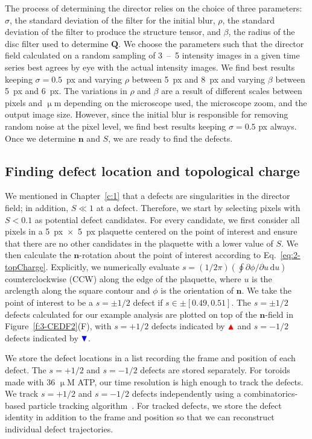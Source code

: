 The process of determining the director relies on the choice of three parameters: $\sigma$, the standard deviation of the filter for the initial blur, $\rho$, the standard deviation of the filter to produce the structure tensor, and $\beta$, the radius of the disc filter used to determine $\mathbf{Q}$.
We choose the parameters such that the director field calculated on a random sampling of 3~--~5 intensity images in a given time series best agrees by eye with the actual intensity images.
We find best results keeping $\sigma = 0.5$~px and varying $\rho$ between 5~px and 8~px and varying $\beta$ between 5~px and 6~px.
The variations in $\rho$ and $\beta$ are a result of different scales between pixels and $\upmu$m depending on the microscope used, the microscope zoom, and the output image size.
However, since the initial blur is responsible for removing random noise at the pixel level, we find best results keeping $\sigma = 0.5$ px always.
Once we determine $\mathbf{n}$ and $S$, we are ready to find the defects.


\subsection{Finding defect location and topological charge}
We mentioned in Chapter~\ref{c:1} that a defects are singularities in the director field; in addition, $S \ll 1$ at a defect.
Therefore, we start by selecting pixels with $S < 0.1$ as potential defect candidates.
For every candidate, we first consider all pixels in a 5~px~$\times$~5~px plaquette centered on the point of interest and ensure that there are no other candidates in the plaquette with a lower value of $S$.
We then calculate the $\mathbf{n}$-rotation about the point of interest according to Eq.~\ref{eq:2-topCharge}.
Explicitly, we numerically evaluate $s = (1 / 2 \pi)(\oint \partial\phi / \partial u \, \textrm{d}u)$ counterclockwise (CCW) along the edge of the plaquette, where $u$ is the arclength along the square contour and $\phi$ is the orientation of $\mathbf{n}$.
We take the point of interest to be a $s = \pm 1/2$ defect if $s \in \pm [0.49,0.51]$.
The $s=\pm1/2$ defects calculated for our example analysis are plotted on top of the $\mathbf{n}$-field in Figure~\ref{f:3-CEDF2}(F), with $s = +1/2$ defects indicated by ${\color{red} \blacktriangle } $  and $s = -1/2$ defects indicated by ${ \color{blue} \blacktriangledown } $.

We store the defect locations in a list recording the frame and position of each defect.
The $s = +1/2$ and $s = -1/2$ defects are stored separately.
For toroids made with 36 $\upmu$M ATP, our time resolution is high enough to track the defects.
We track $s = +1/2$ and $s = -1/2$ defects independently using a combinatorics-based particle tracking algorithm~\cite{RN54,crockerGrierNotes}.
For tracked defects, we store the defect identity in addition to the frame and position so that we can reconstruct individual defect trajectories.



